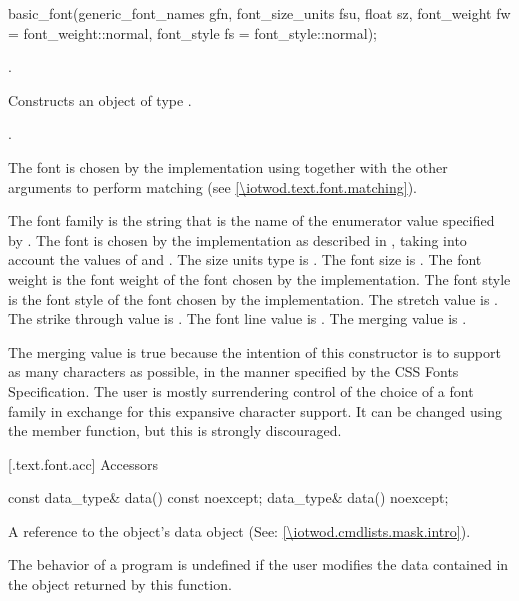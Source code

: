 %
\begin{itemdecl}
basic_font(generic_font_names gfn, font_size_units fsu, float sz, 
  font_weight fw = font_weight::normal, font_style fs = font_style::normal);
\end{itemdecl}
\begin{itemdescr}
\pnum
\requires {}.

\pnum
\effects Constructs an object of type .

\pnum
\postconditions {}.

\pnum
\remarks The font is chosen by the implementation using  together with the other arguments to perform matching (see \ref{\iotwod.text.font.matching}).

\pnum The font family is the string that is the name of the enumerator value specified by . The font is chosen by the implementation as described in , taking into account the values of  and . The size units type is . The font size is . The font weight is the font weight of the font chosen by the implementation. The font style is the font style of the font chosen by the implementation. The stretch value is . The strike through value is . The font line value is . The merging value is .

\pnum
\begin{note}
The merging value is true because the intention of this constructor is to support as many characters as possible, in the manner specified by the CSS Fonts Specification. The user is mostly surrendering control of the choice of a font family in exchange for this expansive character support. It can be changed using the  member function, but this is strongly discouraged.
\end{note}
\end{itemdescr}

 [\iotwod.text.font.acc] {Accessors}%

%
\begin{itemdecl}
const data_type& data() const noexcept;
data_type& data() noexcept;
\end{itemdecl}
\begin{itemdescr}
\pnum
\returns A reference to the  object's data object (See: \ref{\iotwod.cmdlists.mask.intro}).

\pnum
\remarks The behavior of a program is undefined if the user modifies the data contained in the  object returned by this function.
\end{itemdescr}

